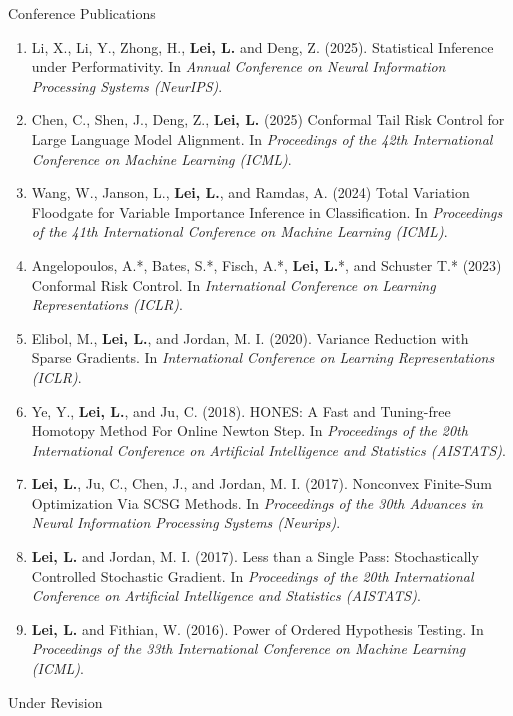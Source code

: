 \documentclass{article}
\begin{document}
\begin{large}
\noindent Conference Publications
\end{large}

\begin{enumerate}
\item {\color{red}Li, X., Li, Y., Zhong, H., \textbf{Lei, L.} and Deng, Z. (2025). Statistical Inference under Performativity. In \emph{Annual Conference on Neural Information Processing Systems (NeurIPS)}}.
\item {\color{red}Chen, C., Shen, J., Deng, Z., \textbf{Lei, L.} (2025) Conformal Tail Risk Control for Large Language Model Alignment. In \emph{Proceedings of the 42th International Conference on Machine Learning (ICML)}}.
\item Wang, W., Janson, L., \textbf{Lei, L.}, and Ramdas, A. (2024) Total Variation Floodgate for Variable Importance Inference in Classification. In \emph{Proceedings of the 41th International Conference on Machine Learning (ICML)}.
\item Angelopoulos, A.*, Bates, S.*, Fisch, A.*, \textbf{Lei, L.}*, and Schuster T.* (2023) Conformal Risk Control. In \emph{International Conference on Learning Representations (ICLR)}.
\item Elibol, M., \textbf{Lei, L.}, and Jordan, M. I. (2020). Variance Reduction with Sparse Gradients. In \emph{International Conference on Learning Representations (ICLR)}.
\item Ye, Y., \textbf{Lei, L.}, and Ju, C. (2018). HONES: A Fast and Tuning-free Homotopy Method For Online Newton Step. In \emph{Proceedings of the 20th International Conference on Artificial Intelligence and Statistics (AISTATS)}.
\item \textbf{Lei, L.}, Ju, C., Chen, J., and Jordan, M. I. (2017). Nonconvex Finite-Sum Optimization Via SCSG Methods. In \emph{Proceedings of the 30th Advances in Neural Information Processing Systems (Neurips)}.
\item \textbf{Lei, L.} and Jordan, M. I. (2017). Less than a Single Pass: Stochastically Controlled Stochastic Gradient. In \emph{Proceedings of the 20th International Conference on Artificial Intelligence and Statistics (AISTATS)}.
\item \textbf{Lei, L.} and Fithian, W. (2016). Power of Ordered Hypothesis Testing. In \emph{Proceedings of the 33th International Conference on Machine Learning (ICML)}.
\end{enumerate}

\begin{large}
\noindent Under Revision
\end{large}
\end{document}
